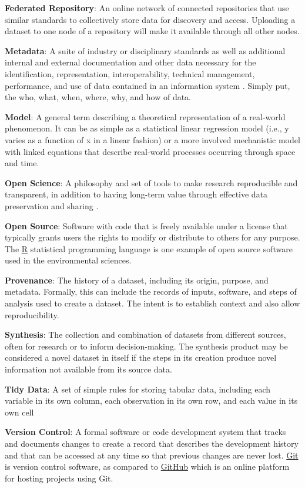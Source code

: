 \documentclass[
]{book}
\begin{document}
\textbf{Federated Repository}: An online network of connected repositories that use similar standards to collectively store data for discovery and access. Uploading a dataset to one node of a repository will make it available through all other nodes.

\textbf{Metadata}: A suite of industry or disciplinary standards as well as additional internal and external documentation and other data necessary for the identification, representation, interoperability, technical management, performance, and use of data contained in an information system \citep{Gilliland16}. Simply put, the who, what, when, where, why, and how of data.

\textbf{Model}: A general term describing a theoretical representation of a real-world phenomenon. It can be as simple as a statistical linear regression model (i.e., y varies as a function of x in a linear fashion) or a more involved mechanistic model with linked equations that describe real-world processes occurring through space and time.

\textbf{Open Science}: A philosophy and set of tools to make research reproducible and transparent, in addition to having long-term value through effective data preservation and sharing \citep{Beck20}.

\textbf{Open Source}: Software with code that is freely available under a license that typically grants users the rights to modify or distribute to others for any purpose. The \href{https://cran.r-project.org/}{R} statistical programming language is one example of open source software used in the environmental sciences.

\textbf{Provenance}: The history of a dataset, including its origin, purpose, and metadata. Formally, this can include the records of inputs, software, and steps of analysis used to create a dataset. The intent is to establish context and also allow reproducibility.

\textbf{Synthesis}: The collection and combination of datasets from different sources, often for research or to inform decision-making. The synthesis product may be considered a novel dataset in itself if the steps in its creation produce novel information not available from its source data.

\textbf{Tidy Data}: A set of simple rules for storing tabular data, including each variable in its own column, each observation in its own row, and each value in its own cell \citep{Wickham14c}

\textbf{Version Control}: A formal software or code development system that tracks and documents changes to create a record that describes the development history and that can be accessed at any time so that previous changes are never lost. \href{https://git-scm.com/}{Git} is version control software, as compared to \href{https://github.com/}{GitHub} which is an online platform for hosting projects using Git.

  
\end{document}
